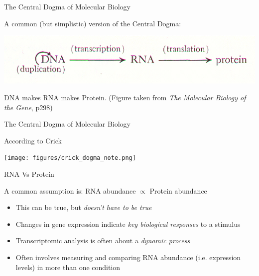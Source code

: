 \documentclass[aspectratio=169,11pt]{beamer}
\begin{document}
\begin{frame}{The Central Dogma of Molecular Biology}

	A common (but simplistic) version of the Central Dogma:
	
	\vspace{3mm}	
	
	\begin{center}
	\includegraphics[scale=1]{figures/Watson_Central_Dogma.jpg} 	
	\end{center}
	
	\vspace{3mm}	
	
	\begin{block}{}
	DNA makes RNA makes Protein.
	(Figure taken from \textit{The Molecular Biology of the Gene}, p298)
	\end{block}
	
	
\end{frame}

\begin{frame}{The Central Dogma of Molecular Biology}

	According to Crick 

	\begin{center}
	\texttt{[image: figures/crick\_dogma\_note.png]}
	\end{center}
	

\end{frame}

\begin{frame}{RNA Vs Protein}

A common assumption is: RNA abundance $\propto$ Protein abundance

	\begin{itemize}
		\item This can be true, but \textit{doesn't have to be true}
		\item Changes in gene expression indicate \textit{key biological responses} to a stimulus
		\item Transcriptomic analysis is often about a \textit{dynamic process}
		\item Often involves measuring and comparing RNA abundance (i.e. expression levels) in more than one condition
	\end{itemize}

\end{frame}
\end{document}

